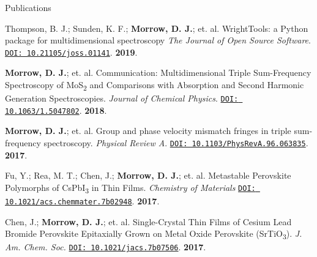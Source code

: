 \documentclass{resume} %
\begin{document}
\begin{rSection}{Publications}
\begin{etaremune}[topsep=0pt,itemsep=0pt,partopsep=0pt,parsep=0pt]
\item Thompson, B. J.; Sunden, K. F.; \textbf{Morrow, D. J.}; et. al. %
WrightTools: a Python package for multidimensional spectroscopy \emph{The Journal of Open Source Software}. 
\href{http://doi.org/10.21105/joss.01141}{\texttt{DOI: 10.21105/joss.01141}}. \textbf{2019}.
	
\item \textbf{Morrow, D. J.}; et. al. %
Communication: Multidimensional Triple Sum-Frequency Spectroscopy of MoS\textsubscript{2} and Comparisons with Absorption and Second Harmonic Generation Spectroscopies. \emph{Journal of Chemical Physics}. \href{http://doi.org/10.1063/1.5047802}{\texttt{DOI: 10.1063/1.5047802}}. \textbf{2018}.
	
\item \textbf{Morrow, D. J.}; et. al. %
Group and phase velocity mismatch fringes in triple sum-frequency spectroscopy. \emph{Physical Review A}. \href{https://journals.aps.org/pra/abstract/10.1103/PhysRevA.96.063835}{\texttt{DOI: 10.1103/PhysRevA.96.063835}}. \textbf{2017}.

\item Fu, Y.; Rea, M. T.; Chen, J.; \textbf{Morrow, D. J.}; et. al. %
Metastable Perovskite Polymorphs of CsPbI\textsubscript{3} in Thin Films. \emph{Chemistry of Materials} \href{http://pubs.acs.org/doi/10.1021/acs.chemmater.7b02948}{\texttt{DOI: 10.1021/acs.chemmater.7b02948}}. \textbf{2017}. 
 
\item Chen, J.; \textbf{Morrow, D. J.}; et. al. %
Single-Crystal Thin Films of Cesium Lead Bromide Perovskite Epitaxially Grown on Metal Oxide Perovskite (SrTiO\textsubscript{3}). \emph{J. Am. Chem. Soc.} \href{http://pubs.acs.org/doi/10.1021/jacs.7b07506}{\texttt{DOI: 10.1021/jacs.7b07506}}. \textbf{2017}. 
	



\end{etaremune}

\end{rSection}
\end{document}
